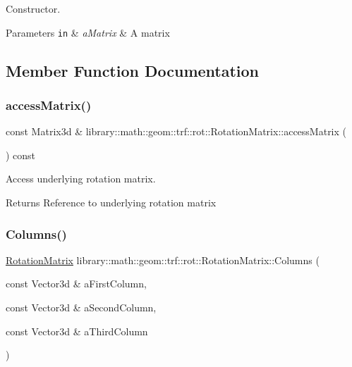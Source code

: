 Constructor. 


\begin{DoxyParams}[1]{Parameters}
\mbox{\tt in}  & {\em a\+Matrix} & A matrix \\
\hline
\end{DoxyParams}


\subsection{Member Function Documentation}
\mbox{\label{classlibrary_1_1math_1_1geom_1_1trf_1_1rot_1_1_rotation_matrix_a957387a407da1658fa63dc6692254175}} 
\subsubsection{\texorpdfstring{access\+Matrix()}{accessMatrix()}}
{\footnotesize\ttfamily const Matrix3d \& library\+::math\+::geom\+::trf\+::rot\+::\+Rotation\+Matrix\+::access\+Matrix (\begin{DoxyParamCaption}{ }\end{DoxyParamCaption}) const}



Access underlying rotation matrix. 

\begin{DoxyReturn}{Returns}
Reference to underlying rotation matrix 
\end{DoxyReturn}
\mbox{\label{classlibrary_1_1math_1_1geom_1_1trf_1_1rot_1_1_rotation_matrix_a5f5385bb26c6a64d869030d7f3bf7b4d}} 
\subsubsection{\texorpdfstring{Columns()}{Columns()}}
{\footnotesize\ttfamily \hyperlink{classlibrary_1_1math_1_1geom_1_1trf_1_1rot_1_1_rotation_matrix}{Rotation\+Matrix} library\+::math\+::geom\+::trf\+::rot\+::\+Rotation\+Matrix\+::\+Columns (\begin{DoxyParamCaption}\item[{const Vector3d \&}]{a\+First\+Column,  }\item[{const Vector3d \&}]{a\+Second\+Column,  }\item[{const Vector3d \&}]{a\+Third\+Column }\end{DoxyParamCaption})\hspace{0.3cm}{\ttfamily [static]}}



